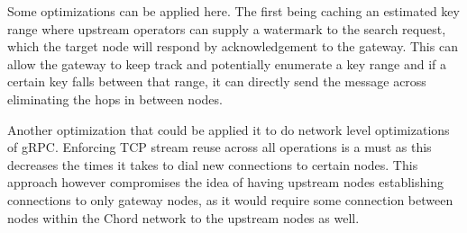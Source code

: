 \documentclass[journal]{IEEEtran}
\begin{document}
Some optimizations can be applied here. The first being caching an estimated key range where upstream operators can supply a watermark to the search request, which the target node will respond by acknowledgement to the gateway. This can allow the gateway to keep track and potentially enumerate a key range and if a certain key falls between that range, it can directly send the message across eliminating the hops in between nodes.

Another optimization that could be applied it to do network level optimizations of gRPC. Enforcing TCP stream reuse across all operations is a must as this decreases the times it takes to dial new connections to certain nodes. This approach however compromises the idea of having upstream nodes establishing connections to only gateway nodes, as it would require some connection between nodes within the Chord network to the upstream nodes as well.
\end{document}
